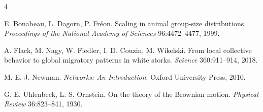 \begin{thebibliography}{4}
\small

 E. Bonabeau, L. Dagorn, P. Fréon. Scaling in animal group-size distributions.
\emph{Proceedings of the National Academy of Sciences} 96:4472--4477, 1999.

 A. Flack, M. Nagy, W. Fiedler, I. D. Couzin, M. Wikelski. From local collective
behavior to global migratory patterns in white storks. \emph{Science} 360:911--914, 2018.

 M. E. J. Newman. \emph{Networks: An Introduction}. Oxford University Press,
2010.

 G. E. Uhlenbeck, L. S. Ornstein. On the theory of the Brownian motion.
\emph{Physical Review} 36:823--841, 1930.

\end{thebibliography}
